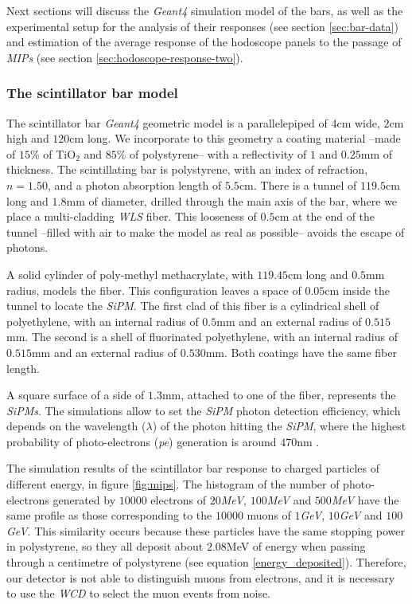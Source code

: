 \documentclass[submitting]{nst}
\begin{document}
Next sections will discuss the \textsl{Geant4} simulation model of the bars, as well as the experimental setup for the analysis of their responses (see section \ref{sec:bar-data}) and estimation of the average response of the hodoscope panels to the passage of \textsl{MIPs} (see section \ref{sec:hodoscope-response-two}). 


\subsubsection{The scintillator bar model} \label{sec:bar-simulation}%
The scintillator bar \textsl{Geant4} geometric model is a parallelepiped of $4$cm wide, $2$cm high and $120$cm long. We incorporate to this geometry a coating material --made of $15$\% of TiO$_2$ and $85$\% of polystyrene-- with a reflectivity of $1$ and $0.25$mm of thickness. The scintillating bar is polystyrene, with an index of refraction, $n=1.50$, and a photon absorption length of $5.5$cm. There is a tunnel of $119.5$cm long and $1.8$mm of diameter, drilled through the main axis of the bar, where we place a multi-cladding \textsl{WLS} fiber. This looseness of $0.5$cm at the end of the tunnel --filled with air to make the model as real as possible-- avoids the escape of photons.

A solid cylinder of poly-methyl methacrylate, with $119.45$cm long and $0.5$mm radius, models the fiber. This configuration leaves a space of $0.05$cm inside the tunnel to locate the \textsl{SiPM}. The first clad of this fiber is a cylindrical shell of polyethylene, with an internal radius of $0.5$mm and an external radius of $0.515$mm. The second is a shell of fluorinated polyethylene, with an internal radius of $0.515$mm and an external radius of $0.530$mm. Both coatings have the same fiber length.

A square surface of a side of $1.3$mm, attached to one of the fiber, represents the \textsl{SiPMs}. The simulations allow to set the \textsl{SiPM} photon detection efficiency, which depends on the wavelength ($\lambda$) of the photon hitting the \textsl{SiPM}, where the highest probability of photo-electrons (\textsl{pe}) generation is around $470$nm \cite{Hamamatsu2018}.

The simulation results of the scintillator bar response to charged particles of different energy, in figure \ref{fig:mips}. The histogram of the number of photo-electrons generated by $10000$ electrons of $20$\textsl{MeV}, $100$\textsl{MeV} and $500$\textsl{MeV} have the same profile as those corresponding to the $10000$ muons of $1$\textsl{GeV}, $10$\textsl{GeV} and $100$\textsl{GeV}. This similarity occurs because these particles have the same stopping power in polystyrene, so they all deposit about $2.08$MeV of energy when passing through a centimetre of polystyrene (see equation \ref{energy_deposited}). Therefore, our detector is not able to distinguish muons from electrons, and it is necessary to use the \textsl{WCD} to select the muon events from noise. 
\end{document}
